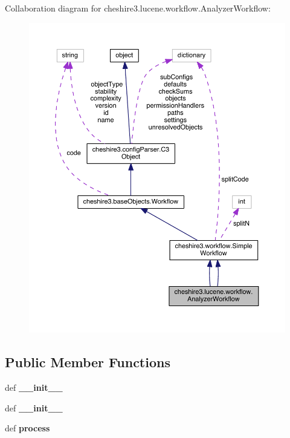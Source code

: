Collaboration diagram for cheshire3.\-lucene.\-workflow.\-Analyzer\-Workflow\-:
\nopagebreak
\begin{figure}[H]
\begin{center}
\leavevmode
\includegraphics[width=350pt]{classcheshire3_1_1lucene_1_1workflow_1_1_analyzer_workflow__coll__graph}
\end{center}
\end{figure}
\subsection*{Public Member Functions}
\begin{DoxyCompactItemize}
\item 
\hypertarget{classcheshire3_1_1lucene_1_1workflow_1_1_analyzer_workflow_a554290efc773accf8937bc7969f24309}{def {\bfseries \-\_\-\-\_\-init\-\_\-\-\_\-}}\label{classcheshire3_1_1lucene_1_1workflow_1_1_analyzer_workflow_a554290efc773accf8937bc7969f24309}

\item 
\hypertarget{classcheshire3_1_1lucene_1_1workflow_1_1_analyzer_workflow_a554290efc773accf8937bc7969f24309}{def {\bfseries \-\_\-\-\_\-init\-\_\-\-\_\-}}\label{classcheshire3_1_1lucene_1_1workflow_1_1_analyzer_workflow_a554290efc773accf8937bc7969f24309}

\item 
\hypertarget{classcheshire3_1_1lucene_1_1workflow_1_1_analyzer_workflow_af9427d2c7b8790085a4cfdb5c3643583}{def {\bfseries process}}\label{classcheshire3_1_1lucene_1_1workflow_1_1_analyzer_workflow_af9427d2c7b8790085a4cfdb5c3643583}

\end{DoxyCompactItemize}
